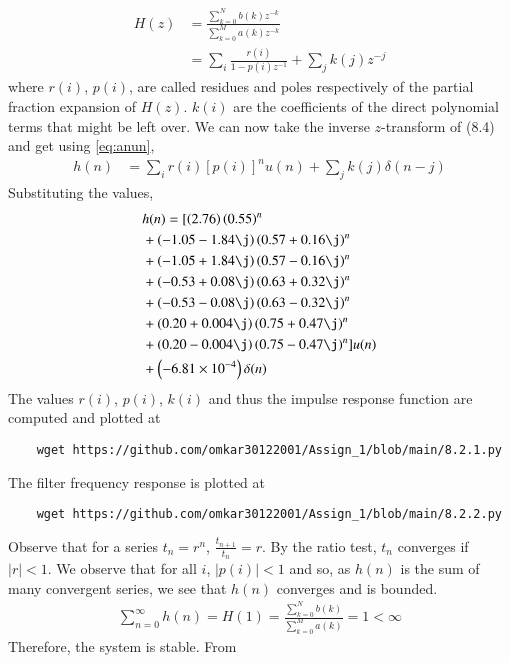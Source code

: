\documentclass[journal,12pt,twocolumn]{IEEEtran}
\renewcommand\thesection{\arabic{section}}
\begin{document}
\begin{enumerate}[label=\thesection.\arabic*]
\begin{enumerate}[label=\thesection.\arabic*]
\begin{align}
		H(z) &= \frac{\sum_{k = 0}^{N}b(k)z^{-k}}{\sum_{k = 0}^{M}a(k)z^{-k}} \\
		&= \sum_{i}\frac{r(i)}{1 - p(i)z^{-1}} + \sum_{j}k(j)z^{-j}
		\label{eq:trans-func}
	\end{align}
	where $r(i)$, $p(i)$, are called residues and poles respectively of the partial 
	fraction expansion of $H(z)$. $k(i)$ are the coefficients of the direct polynomial 
	terms that might be left over. We can now take the inverse $z$-transform of (8.4) and get using \eqref{eq:anun},
	\begin{align}
		h(n) &= \sum_{i}r(i)[p(i)]^nu(n) + \sum_{j}k(j)\delta(n - j)
		\label{eq:h-n-expr}
	\end{align}
	Substituting the values,
	\begin{align}
		&h(n) = [\brak{2.76}\brak{0.55}^n \nonumber \\ 
		&+ \brak{-1.05-1.84\j}\brak{0.57+0.16\j}^n \nonumber \\
		&+ \brak{-1.05+1.84\j}\brak{0.57-0.16\j}^n \nonumber \\
		&+ \brak{-0.53+0.08\j}\brak{0.63+0.32\j}^n \nonumber \\
		&+ \brak{-0.53-0.08\j}\brak{0.63-0.32\j}^n \nonumber \\
		&+ \brak{0.20+0.004\j}\brak{0.75+0.47\j}^n \nonumber \\
		&+ \brak{0.20-0.004\j}\brak{0.75-0.47\j}^n]u(n) \nonumber \\
		&+ \brak{-6.81 \times 10^{-4}}\delta(n)
	\end{align}
	The values $r(i)$, $p(i)$, $k(i)$ and thus the impulse response function are computed and plotted at
	\begin{lstlisting}
	wget https://github.com/omkar30122001/Assign_1/blob/main/8.2.1.py
	\end{lstlisting}
	The filter frequency response is plotted at
	\begin{lstlisting}
	wget https://github.com/omkar30122001/Assign_1/blob/main/8.2.2.py
	\end{lstlisting}
	Observe that for a series $t_n = r^n$, $\frac{t_{n + 1}}{t_n} = r$.
	By the ratio test, $t_n$ converges if $|r| < 1$. We observe that for all $i$, 
	$|p(i)| < 1$ and so, as $h(n)$ is the sum of many convergent series,
	we see that $h(n)$ converges and is bounded.
	\begin{align}
		\sum_{n = 0}^{\infty}h(n) = H(1) = \frac{\sum_{k = 0}^{N}b(k)}{\sum_{k = 0}^{M}a(k)} = 1 < \infty
	\end{align}
	Therefore, the system is stable. From

\end{enumerate}
\end{enumerate}
\end{document}
